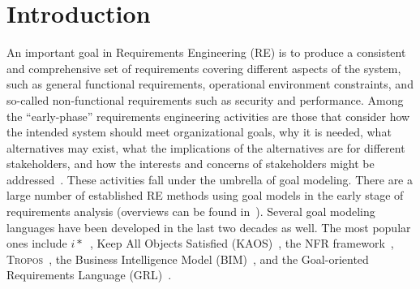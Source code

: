 \section{Introduction}
\label{sect:introduction}

An important goal in Requirements Engineering (RE) is to produce a consistent and comprehensive set of requirements covering different aspects of the system, such as general functional requirements, operational environment constraints, and so-called non-functional requirements such as security and performance. Among the ``early-phase'' requirements engineering activities are those that consider how the intended system should meet organizational goals, why it is needed, what alternatives may exist, what the implications of the alternatives are for different stakeholders, and how the interests and concerns of stakeholders might be addressed~\cite{yu1997towards}. These activities fall under the umbrella of goal modeling. There are a large number of established RE methods using goal models in the early stage of requirements analysis (overviews can be found in~\cite{kavakliL05,van2001goal}). Several goal modeling languages have been developed in the last two decades as well. The most popular ones include $i*$~\cite{yu1997towards}, Keep All Objects Satisfied (KAOS)~\cite{van2008requirements}, the NFR framework~\cite{chung2012non}, \textsc{Tropos}~\cite{giorgini2005goal}, the Business Intelligence Model (BIM)~\cite{horkoff2014strategic}, and the Goal-oriented Requirements Language (GRL)~\cite{Amyot:2010:EGM:1841349.1841356}.



